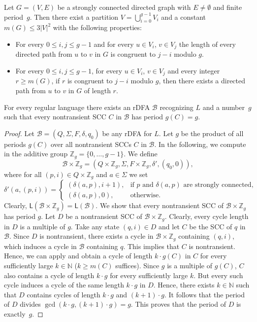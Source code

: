 \documentclass{theoretics}
\newcommand{\N}{\mathbb{N}}
\newcommand{\Z}{\mathbb{Z}}
\newcommand{\B}{\mathcal{B}}
\renewcommand{\L}{\mathsf{L}}
\renewcommand{\geq}{\geqslant}
\renewcommand{\leq}{\leqslant}
\begin{document}
\begin{lemma} \label{lemma-alon}
Let $G = (V, E)$ be a strongly connected directed graph with $E \neq \emptyset$ and finite period~$g$. 
Then there exist a partition $V = \bigcup_{i=0}^{g-1} V_i$ and a constant $m(G) \leq  3|V|^2$ with the following properties:
\begin{itemize}
\item For every $0 \leq i,j \leq g-1$ and for every $u \in V_i$, $v \in V_j$ the length of every directed path from $u$ to 
$v$ in $G$ is congruent to $j-i$ modulo $g$.
\item For every $0 \leq i,j \leq g-1$, for every $u \in V_i$, $v \in V_j$ and every 
integer $r \geq m(G)$, if $r$ is congruent to $j-i$ modulo $g$, then there exists a directed path from $u$ to $v$ in $G$ of length $r$.
\end{itemize}
\end{lemma}

\begin{lemma}
\label{lem:uni-per}
For every regular language there exists an rDFA $\B$ recognizing $L$ and a number~$g$
such that every nontransient SCC $C$ in $\B$ has period $g(C) = g$.
\end{lemma}

\begin{proof}
Let $\B = (Q,\Sigma,F,\delta,q_0)$ be any rDFA for $L$.
Let $g$ be the product of all periods $g(C)$ over all nontransient SCCs $C$ in $\B$.
In the following, we compute in the additive group $\Z_g = \{0,\ldots,g-1\}$.
We define
\[
	\B \times \Z_g = (Q \times \Z_g, \Sigma, F \times \Z_g, \delta', (q_0,0)),
\]
where for all $(p,i) \in Q \times \Z_g$ and $a \in \Sigma$ we set
\[
	\delta'(a,(p,i)) = \begin{cases}
	(\delta(a,p),i+1), & \text{if } p \text{ and } \delta(a,p) \text{ are strongly connected}, \\
	(\delta(a,p),0), & \text{otherwise.}
	\end{cases}
\]
Clearly, $\L(\B \times \Z_g) = \L(\B)$.
We show that every nontransient SCC of $\B \times \Z_g$ has period $g$.
Let $D$ be a nontransient  SCC of $\B \times \Z_g$.
Clearly, every cycle length in $D$ is a multiple of $g$.
Take any state $(q,i) \in D$ and let $C$ be the SCC of $q$ in $\B$.
Since $D$ is nontransient, there exists a cycle in $\B \times \Z_g$
containing $(q,i)$,
which induces a cycle in $\B$ containing $q$.
This implies that $C$ is nontransient.
Hence, we can apply  and obtain a cycle of length $k \cdot g(C)$ in $C$
for every sufficiently large $k \in \N$ ($k \geq m(C)$ suffices).
Since $g$ is a multiple of $g(C)$, $C$ also contains a cycle of length 
$k \cdot g$ for every sufficiently large $k$. But every such cycle induces
a cycle of the same length $k \cdot g$ in $D$.
Hence, there exists $k \in \N$ such that 
$D$ contains cycles of length $k \cdot g$ and $(k+1) \cdot g$.
It follows that the period of  $D$ divides $\gcd(k \cdot g, (k+1) \cdot g) = g$.
This proves that the period of $D$ is exactly~$g$.
\end{proof}
\end{document}
